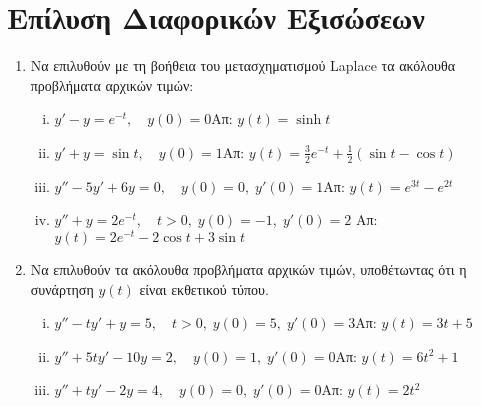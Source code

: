 \section*{Επίλυση Διαφορικών Εξισώσεων}

\begin{enumerate}
  \item Να επιλυθούν με τη βοήθεια του μετασχηματισμού Laplace τα ακόλουθα προβλήματα 
    αρχικών τιμών:
    \begin{enumerate}[i)]
      \item $y'-y=e^{-t},\quad y(0)=0$\hfill Απ: $y(t)=\sinh t$
      \item $y'+y=\sin t,\quad y(0)=1$\hfill Απ: $y(t)=\frac{3}{2}e^{-t}+
        \frac{1}{2}(\sin t-\cos t)$
      \item $y''-5y'+6y=0,\quad y(0)=0, \; y'(0)=1$\hfill Απ: $y(t)=e^{3t}-e^{2t}$
      \item $y''+y=2e^{-t},\quad t>0,\; y(0)=-1,\; y'(0)=2$
        \hfill Απ: $y(t)=2e^{-t}-2\cos t+3 \sin t$
    \end{enumerate}

  \item\label{it:ekth} Να επιλυθούν τα ακόλουθα προβλήματα αρχικών τιμών, υποθέτωντας 
    ότι η συνάρτηση $ y(t) $ είναι εκθετικού τύπου.
    \begin{enumerate}[i)]
      \item $y''-ty'+y=5, \quad t>0,\; y(0)=5,\; y'(0)=3$\hfill Απ: $y(t)=3t+5$
      \item $y'' +5ty'-10y=2, \quad y(0)=1,\; y'(0)=0$\hfill Απ: $y(t)=6t^2+1$
      \item $y'' +ty'-2y=4, \quad y(0)=0,\; y'(0)=0$\hfill Απ: $y(t)=2t^2$
    \end{enumerate}

    \pagebreak


\end{enumerate}
